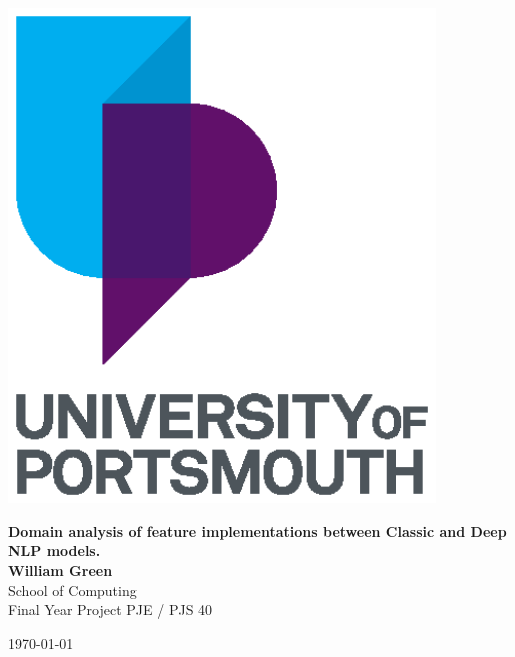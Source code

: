 \documentclass[12pt, a4paper]{report}
\begin{document}
\thispagestyle{empty}	%
\vspace*{1mm}	%
\includegraphics[width=0.85\textwidth, center]{figures/UoP_Primary_Logo_Stacked_pms.eps}
\vspace{8mm}

\begin{center}
\LARGE\textbf{\textsf{Domain analysis of feature implementations between Classic and Deep NLP models.}}\\
\vspace{1mm}
\large \textbf{William Green}\\

\vspace{10mm}
\normalsize School of Computing \\ Final Year Project PJE / PJS 40

\vspace{20mm}
%
\today	%
\end{center}
\newpage
{}	%
\end{document}
